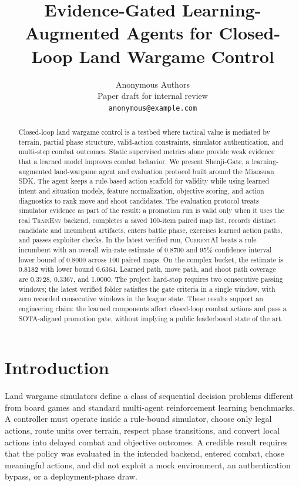 \documentclass{article}
\title{Evidence-Gated Learning-Augmented Agents for Closed-Loop Land Wargame Control}
\author{
  Anonymous Authors \\
  Paper draft for internal review \\
  \texttt{anonymous@example.com}
}
\newcommand{\method}{Shenji-Gate}
\newcommand{\env}{\textsc{TrainEnv}}
\newcommand{\currentai}{\textsc{CurrentAI}}
\begin{document}
\maketitle

\begin{abstract}
Closed-loop land wargame control is a testbed where tactical value is mediated by terrain, partial phase structure, valid-action constraints, simulator authentication, and multi-step combat outcomes. Static supervised metrics alone provide weak evidence that a learned model improves combat behavior. We present \method, a learning-augmented land-wargame agent and evaluation protocol built around the Miaosuan SDK. The agent keeps a rule-based action scaffold for validity while using learned intent and situation models, feature normalization, objective scoring, and action diagnostics to rank move and shoot candidates. The evaluation protocol treats simulator evidence as part of the result: a promotion run is valid only when it uses the real \env{} backend, completes a saved 100-item paired map list, records distinct candidate and incumbent artifacts, enters battle phase, exercises learned action paths, and passes exploiter checks. In the latest verified run, \currentai{} beats a rule incumbent with an overall win-rate estimate of 0.8700 and 95\% confidence interval lower bound of 0.8000 across 100 paired maps. On the complex bucket, the estimate is 0.8182 with lower bound 0.6364. Learned path, move path, and shoot path coverage are 0.3728, 0.3367, and 1.0000. The project hard-stop requires two consecutive passing windows; the latest verified folder satisfies the gate criteria in a single window, with zero recorded consecutive windows in the league state. These results support an engineering claim: the learned components affect closed-loop combat actions and pass a SOTA-aligned promotion gate, without implying a public leaderboard state of the art.
\end{abstract}

\section{Introduction}

Land wargame simulators define a class of sequential decision problems different from board games and standard multi-agent reinforcement learning benchmarks. A controller must operate inside a rule-bound simulator, choose only legal actions, route units over terrain, respect phase transitions, and convert local actions into delayed combat and objective outcomes. A credible result requires that the policy was evaluated in the intended backend, entered combat, chose meaningful actions, and did not exploit a mock environment, an authentication bypass, or a deployment-phase draw.
\end{document}

